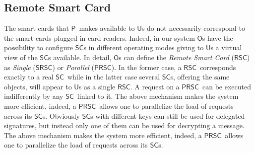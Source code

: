 \documentclass{sig-alternate}
\newcommand{\Owner}{\ensuremath{\mathsf{O}}}
\newcommand{\User}{\ensuremath{\mathsf{U}}}
\newcommand{\Proxy}{\ensuremath{\mathsf{P}}}
\newcommand{\SC}{\ensuremath{\mathsf{SC}}}
\newcommand{\RSC}{\ensuremath{\mathsf{RSC}}}
\newcommand{\SRSC}{\ensuremath{\mathsf{SRSC}}}
\newcommand{\PRSC}{\ensuremath{\mathsf{PRSC}}}
\begin{document}
\subsection{Remote Smart Card}
The smart cards that \Proxy\ makes available to \User s do not necessarily correspond to the smart cards plugged in card readers. Indeed, in our system \Owner s have the possibility to configure \SC s in different operating modes giving to \User s a virtual view of the \SC s available. In detail, \Owner s can define the \emph{Remote Smart Card} (\RSC) as \emph{Single} (\SRSC) or \emph{Parallel} (\PRSC). In the former case, a \RSC\ corresponds exactly to a real \SC\ while in the latter case several \SC s, offering the same objects, will appear to \User s as a single \RSC . A request on a \PRSC\ can be executed indifferently by any \SC\ linked to it. 
The above mechanism makes the system more efficient, indeed, a \PRSC\ allows one to parallelize the load of requests across its \SC s.
Obviously \SC s with different keys can still be used for delegated signatures, but instead only one of them can be used for decrypting a message.
The above mechanism makes the system more efficient, indeed, a \PRSC\ allows one to parallelize the load of requests across its \SC s.
\end{document}
